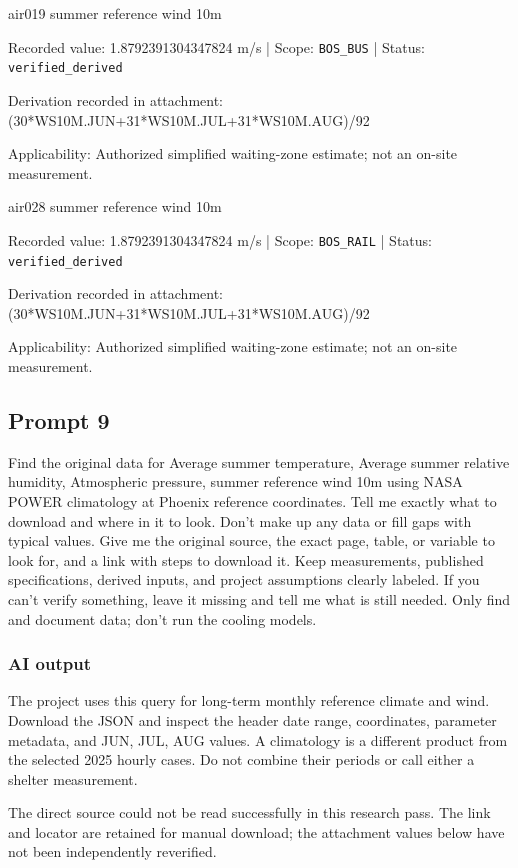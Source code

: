air019  summer reference wind 10m

Recorded value: 1.8792391304347824 m/s | Scope: \nolinkurl{BOS_BUS} | Status: \nolinkurl{verified_derived}

Derivation recorded in attachment: (30*WS10M.JUN+31*WS10M.JUL+31*WS10M.AUG)/92

Applicability: Authorized simplified waiting-zone estimate; not an on-site measurement.

air028  summer reference wind 10m

Recorded value: 1.8792391304347824 m/s | Scope: \nolinkurl{BOS_RAIL} | Status: \nolinkurl{verified_derived}

Derivation recorded in attachment: (30*WS10M.JUN+31*WS10M.JUL+31*WS10M.AUG)/92

Applicability: Authorized simplified waiting-zone estimate; not an on-site measurement.

\subsection*{Prompt 9}
Find the original data for Average summer temperature, Average summer relative humidity, Atmospheric pressure, summer reference wind 10m using NASA POWER climatology at Phoenix reference coordinates. Tell me exactly what to download and where in it to look. Don’t make up any data or fill gaps with typical values. Give me the original source, the exact page, table, or variable to look for, and a link with steps to download it. Keep measurements, published specifications, derived inputs, and project assumptions clearly labeled. If you can’t verify something, leave it missing and tell me what is still needed. Only find and document data; don’t run the cooling models.

\subsubsection*{AI output}
The project uses this query for long-term monthly reference climate and wind. Download the JSON and inspect the header date range, coordinates, parameter metadata, and JUN, JUL, AUG values. A climatology is a different product from the selected 2025 hourly cases. Do not combine their periods or call either a shelter measurement.

The direct source could not be read successfully in this research pass. The link and locator are retained for manual download; the attachment values below have not been independently reverified.

